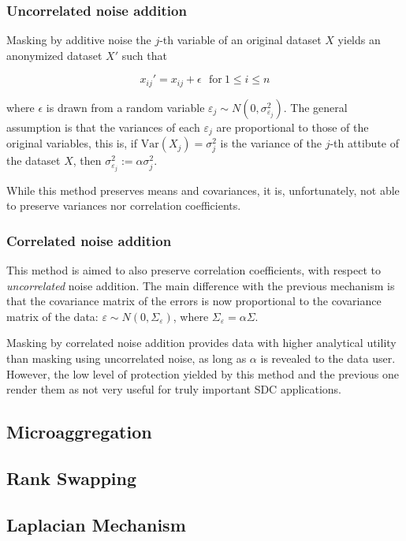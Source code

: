 \subsubsection{Uncorrelated noise addition}

Masking by additive noise the $j$-th variable of an original dataset $X$ yields an anonymized dataset $X'$ such that

\begin{equation}
x_{ij}' = x_{ij} + \epsilon\ \ \ \text{for}\ 1 \leq i \leq n
\end{equation}

where $\epsilon$ is drawn from a random variable $\varepsilon_j \sim N(0,\sigma_{\varepsilon_j}^2)$. The general assumption is that the variances of each $\varepsilon_j$ are proportional to those of the original variables, this is, if $\textrm{Var}(X_j) = \sigma_j^2$ is the variance of the $j$-th attibute of the dataset $X$, then $\sigma_{\varepsilon_j}^2 := \alpha\sigma_j^2$.

While this method preserves means and covariances, it is, unfortunately, not able to preserve variances nor correlation coefficients.

\subsubsection{Correlated noise addition}

This method is aimed to also preserve correlation coefficients, with respect to \textit{uncorrelated} noise addition. The main difference with the previous mechanism is that the covariance matrix of the errors is now proportional to the covariance matrix of the data: $\varepsilon \sim N(0,\Sigma_\varepsilon)$, where $\Sigma_\varepsilon = \alpha\Sigma$.

Masking by correlated noise addition provides data with higher analytical utility than masking using uncorrelated noise, as long as $\alpha$ is revealed to the data user. However, the low level of protection yielded by this method and the previous one render them as not very useful for truly important SDC applications.

\subsection{Microaggregation}
\label{Theory:SDCMethods:Microaggregation}


\subsection{Rank Swapping}
\label{Theory:SDCMethods:RankSwapping}


\subsection{Laplacian Mechanism}
\label{Theory:SDCMethods:LaplacianMechanism}

